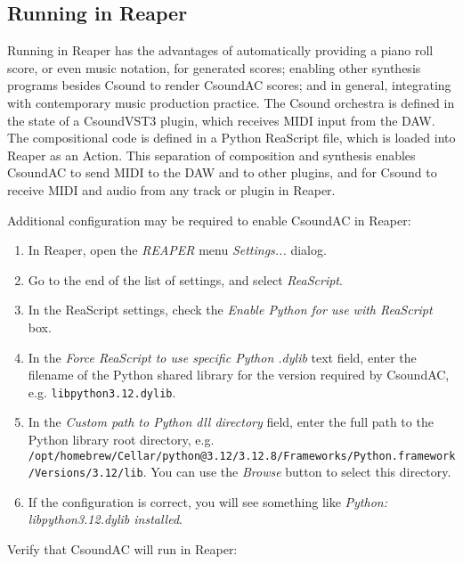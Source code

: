 \documentclass[letterpaper,10pt]{scrartcl}
\begin{document}
\subsection{Running in Reaper}

Running in Reaper has the advantages of automatically providing a piano roll score, or even music notation, for generated scores; enabling other synthesis programs besides Csound to render CsoundAC scores; and in general, integrating with contemporary music production practice. The Csound orchestra is defined in the state of a CsoundVST3 plugin, which receives MIDI input from the DAW. The compositional code is defined in a Python ReaScript file, which is loaded into Reaper as an Action. This separation of composition and synthesis enables CsoundAC to send MIDI to the DAW and to other plugins, and for Csound to receive MIDI and audio from any track or plugin in Reaper.

Additional configuration may be required to enable CsoundAC in Reaper:

\begin{enumerate}
\item In Reaper, open the \emph{REAPER} menu \emph{Settings...} dialog.
\item Go to the end of the list of settings, and select \emph{ReaScript}.
\item In the ReaScript settings, check the \emph{Enable Python for use with ReaScript} box.
\item In the \emph{Force ReaScript to use specific Python .dylib} text field, enter the filename of the Python shared library for the version required by CsoundAC, e.g. \lstinline|libpython3.12.dylib|. 
\item In the \emph{Custom path to Python dll directory} field, enter the full path to the Python library root directory, e.g. \lstinline|/opt/homebrew/Cellar/python@3.12/3.12.8/Frameworks/Python.framework/Versions/3.12/lib|. You can use the \emph{Browse} button to select this directory.
\item If the configuration is correct, you will see something like \emph{Python: libpython3.12.dylib installed}.
\end{enumerate}

\noindent Verify that CsoundAC will run in Reaper:
\end{document}
